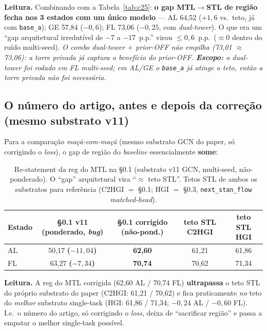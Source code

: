 \documentclass[11pt,a4paper]{article}
\newcommand{\good}[1]{\textcolor{green!45!black}{\textbf{#1}}}
\newcommand{\bad}[1]{\textcolor{red!60!black}{\textbf{#1}}}
\newcommand{\note}[1]{\textcolor{black!55}{\textit{#1}}}
\begin{document}
\noindent\textbf{Leitura.} Combinando com a Tabela~\ref{tab:c25}: \textbf{o gap MTL$\to$STL de região
fecha nos 3 estados com um único modelo} --- AL 64,52 (\good{$+1{,}6$} vs.\ teto, já com \texttt{base\_a});
GE 57,84 ($-0{,}6$); FL 73,06 ($-0{,}25$, com \textit{dual-tower}). O que era um ``gap arquitetural
irredutível de $-7$ a $-17$~p.p.'' virou $\le 0{,}6$~p.p.\ ($\approx 0$ dentro do ruído multi-seed).
\note{O combo \textit{dual-tower} $+$ \textit{prior}-OFF \emph{não} empilha (73,01 $\approx$ 73,06): a
torre privada já captura o benefício do \textit{prior}-OFF. \textbf{Escopo:} o \textit{dual-tower} foi
rodado em FL multi-seed; em AL/GE o \texttt{base\_a} já atinge o teto, então a torre privada não foi
necessária.}

\subsection{O número do artigo, antes e depois da correção (mesmo substrato v11)}\label{sec:c25-num}

Para a comparação \emph{maçã-com-maçã} (mesmo substrato GCN do paper, só corrigindo o
\textit{loss}), o gap de região do \textit{baseline} essencialmente \textbf{some}:

\begin{table}[H]
\centering
\footnotesize
\caption{Re-statement da reg do MTL na \S0.1 (substrato v11 GCN, multi-seed, não-ponderado). O
``gap'' arquitetural vira ``$\approx$ teto STL''. Tetos STL de ambos os substratos para referência
(C2HGI $=$ \S0.1; HGI $=$ \S0.3, \texttt{next\_stan\_flow} \textit{matched-head}).}
\begin{tabular}{lcccc}
\toprule
\textbf{Estado} & \textbf{\S0.1 v11 (ponderado, \emph{bug})} & \textbf{\S0.1 corrigido (não-pond.)} & \textbf{teto STL C2HGI} & \textbf{teto STL HGI} \\
\midrule
AL & 50,17 \bad{($-11,04$)} & \good{62,60} & 61,21 & 61,86 \\
FL & 63,27 \bad{($-7,34$)} & \good{70,74} & 70,62 & 71,34 \\
\bottomrule
\end{tabular}
\end{table}

\noindent\textbf{Leitura.} A reg do MTL corrigida (62,60 AL / 70,74 FL) \textbf{ultrapassa} o teto STL
do próprio substrato do paper (C2HGI: 61,21 / 70,62) e fica praticamente \emph{no} teto do
\emph{melhor} substrato single-task (HGI: 61,86 / 71,34; $-0{,}24$ AL / $-0{,}60$ FL). I.e.\ o número
do artigo, só corrigindo o \textit{loss}, deixa de ``sacrificar região'' e passa a empatar o melhor
single-task possível.
\end{document}

